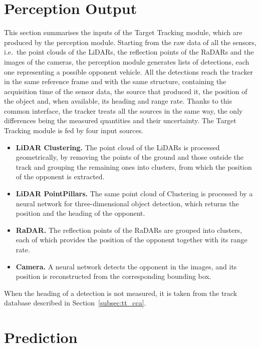 \section{Perception Output}
\label{sec:tt_perception}

This section summarises the inputs of the Target Tracking module, which are produced by the
perception module. Starting from the raw data of all the sensors, i.e.\ the point clouds of
the LiDARs, the reflection points of the RaDARs and the images of the cameras, the perception
module generates lists of detections, each one representing a possible opponent vehicle. All the detections
reach the tracker in the same reference frame and with the same structure, containing the
acquisition time of the sensor data, the source that produced it, the position of the object
and, when available, its heading and range rate. Thanks to this common interface, the tracker
treats all the sources in the same way, the only differences being the measured quantities and
their uncertainty. The Target Tracking module is fed by four input sources.
\begin{itemize}
    \item \textbf{LiDAR Clustering.} The point cloud of the LiDARs is processed geometrically,
    by removing the points of the ground and those outside the track and grouping the
    remaining ones into clusters, from which the position of the opponent is extracted.
    \item \textbf{LiDAR PointPillars.} The same point cloud of Clustering is processed by a neural network
    for three-dimensional object detection, which returns the position and the heading of the
    opponent.
    \item \textbf{RaDAR.} The reflection points of the RaDARs are grouped into clusters, each
    of which provides the position of the opponent together with its range rate.
    \item \textbf{Camera.} A neural network detects the opponent in the images, and its
    position is reconstructed from the corresponding bounding box.
\end{itemize}
When the heading of a detection is not measured, it is taken from the track database
described in Section~\ref{subsec:tt_cca}.

\section{Prediction}
\label{sec:tt_prediction}

